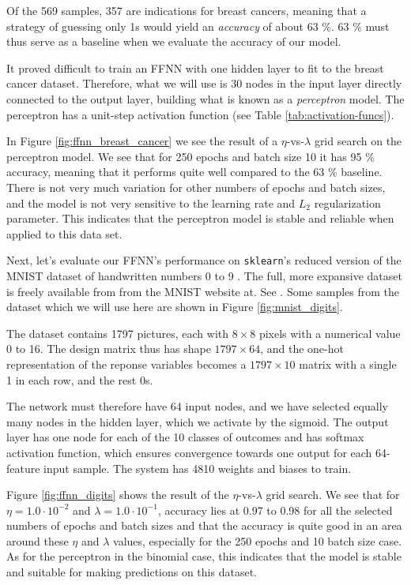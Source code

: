 \documentclass[]{article}
\begin{document}
Of the 569 samples, 357 are  indications for breast cancers, meaning that a strategy of guessing only 1s would yield an \textit{accuracy} of about 63 \%. 63 \% must thus serve as a baseline when we evaluate the accuracy of our model.

It proved difficult to train an FFNN with one hidden layer to fit to the breast cancer dataset. Therefore, what we will use is 30 nodes in the input layer directly connected to the output layer, building what is known as a \textit{perceptron} model. The perceptron has a unit-step activation function (see Table \ref{tab:activation-funcs}).

In Figure \ref{fig:ffnn_breast_cancer} we see the result of a $\eta$-vs-$\lambda$ grid search on the perceptron model. We see that for 250 epochs and batch size 10 it has 95 \% accuracy, meaning that it performs quite well compared to the 63 \% baseline. There is not very much variation for other numbers of epochs and batch sizes, and the model is not very sensitive to the learning rate and $L_2$ regularization parameter. This indicates that the perceptron model is stable and reliable when applied to this data set.

\vspace{5mm}

Next, let's evaluate our FFNN's performance on \lstinline|sklearn|'s reduced version of the MNIST dataset of handwritten numbers 0 to 9 \cite{skl-datasets}. The full, more expansive dataset is freely available from from the MNIST website at. See \cite{mnist}. Some samples from the dataset which we will use here are shown in Figure \ref{fig:mnist_digits}. 

The dataset contains 1797 pictures, each with $8 \times 8$ pixels with a numerical value 0 to 16. The design matrix thus has shape $1797 \times 64$, and the one-hot representation of the reponse variables becomes a $1797 \times 10$ matrix with a single 1 in each row, and the rest 0s.

The network must therefore have 64 input nodes, and we have selected equally many nodes in the hidden layer, which we activate by the sigmoid. The output layer has one node for each of the 10 classes of outcomes and has softmax activation function, which ensures convergence towards one output for each 64-feature input sample. The system has 4810 weights and biases to train.

Figure \ref{fig:ffnn_digits} shows the result of the $\eta$-vs-$\lambda$ grid search. We see that for $\eta = 1.0 \cdot 10^{-2}$ and $\lambda = 1.0 \cdot 10^{-1}$, accuracy lies at 0.97 to 0.98 for all the selected numbers of epochs and batch sizes and that the accuracy is quite good in an area around these $\eta$ and $\lambda$ values, especially for the 250 epochs and 10 batch size case. As for the perceptron in the binomial case, this indicates that the model is stable and suitable for making predictions on this dataset.
\end{document}
